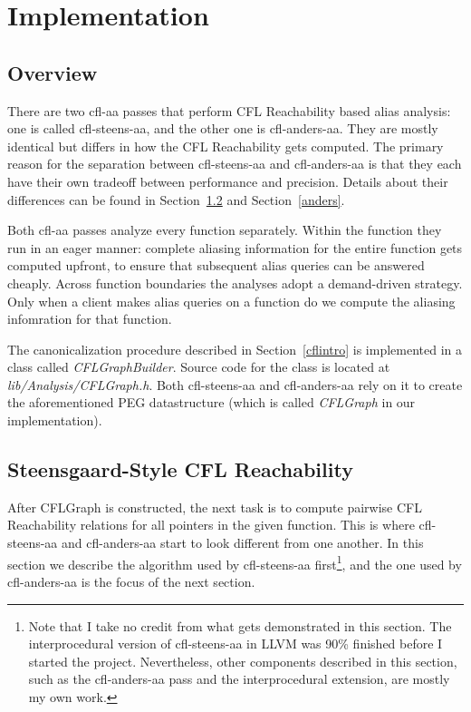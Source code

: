 \documentclass[10pt]{article}
\begin{document}
\section{Implementation}\label{implementation}

\subsection{Overview}

There are two cfl-aa passes that perform CFL Reachability based alias
analysis: one is called cfl-steens-aa, and the other one is cfl-anders-aa. They
are mostly identical but differs in how the CFL Reachability gets computed. The
primary reason for the separation between cfl-steens-aa and cfl-anders-aa is
that they each have their own tradeoff between performance and precision.
Details about their differences can be found in Section~\ref{steens} and Section~\ref{anders}.

Both cfl-aa passes analyze every function separately. Within the function they run in an
eager manner: complete aliasing information for the entire function gets computed
upfront, to ensure that subsequent alias queries can be answered cheaply. Across
function boundaries the analyses adopt a demand-driven strategy. Only when a
client makes alias queries on a function do we compute the aliasing infomration
for that function.

The canonicalization procedure described in Section~\ref{cflintro} is
implemented in a
class called \emph{CFLGraphBuilder}. Source code for the class is located at 
\emph{lib/Analysis/CFLGraph.h}. Both cfl-steens-aa and cfl-anders-aa rely on
it to create the aforementioned PEG datastructure (which is called
\emph{CFLGraph} in our implementation).

\subsection{Steensgaard-Style CFL Reachability}\label{steens}

After CFLGraph is constructed, the next task is to compute pairwise CFL Reachability
relations for all pointers in the given function. This is where cfl-steens-aa
and cfl-anders-aa start to look different from one another. In this section we describe the algorithm
used by cfl-steens-aa first\footnote{Note that I take no credit from what gets
  demonstrated in this section. The interprocedural version of cfl-steens-aa in
  LLVM was 90\% finished before I started the project. Nevertheless, other
  components described in this section, such as the cfl-anders-aa pass and the
  interprocedural extension, are mostly my own work. }, and the one used by cfl-anders-aa is the focus of
the next section. 
\end{document}
